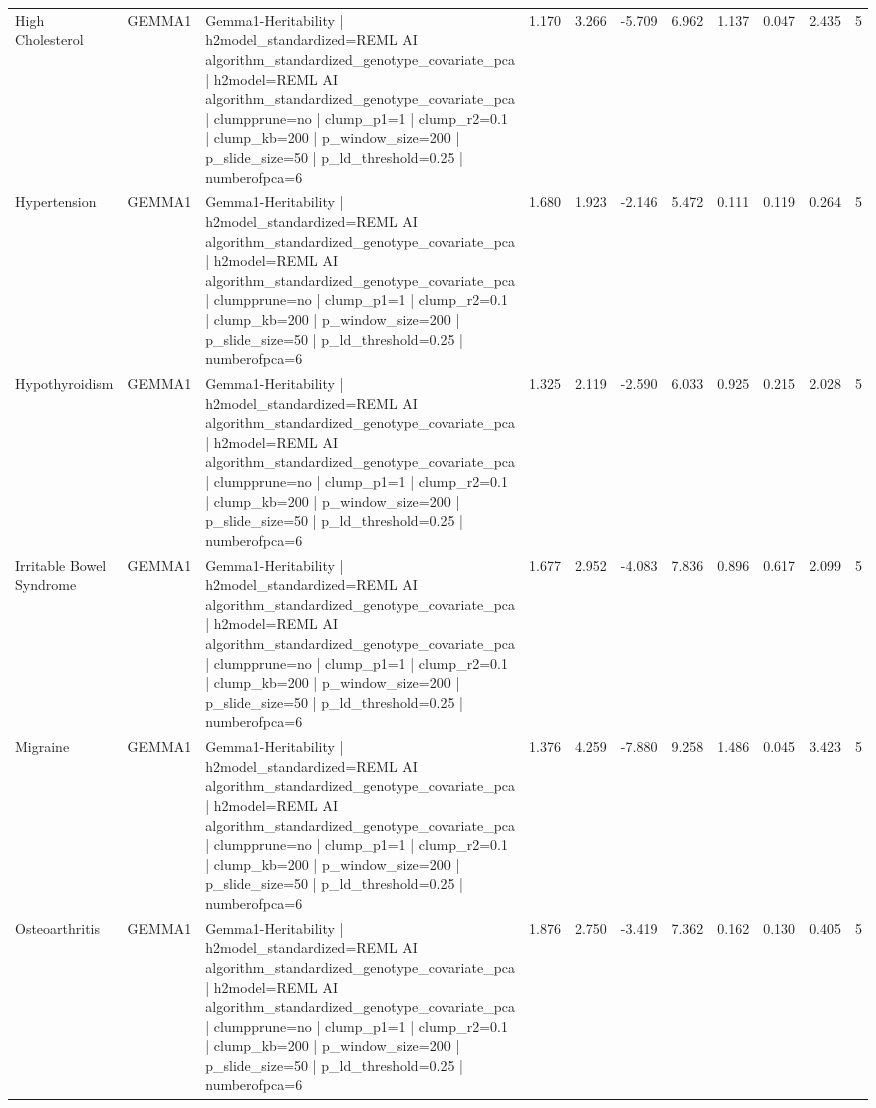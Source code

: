 \begin{landscape}
\begin{longtable}{p{2.4cm}p{1.8cm}p{6.0cm}rrrrrrrr}
High Cholesterol & GEMMA1 & Gemma1-Heritability | h2model\_standardized=REML AI algorithm\_standardized\_genotype\_covariate\_pca | h2model=REML AI algorithm\_standardized\_genotype\_covariate\_pca | clumpprune=no | clump\_p1=1 | clump\_r2=0.1 | clump\_kb=200 | p\_window\_size=200 | p\_slide\_size=50 | p\_ld\_threshold=0.25 | numberofpca=6 & 1.170 & 3.266 & -5.709 & 6.962 & 1.137 & 0.047 & 2.435 & 5 \\
Hypertension & GEMMA1 & Gemma1-Heritability | h2model\_standardized=REML AI algorithm\_standardized\_genotype\_covariate\_pca | h2model=REML AI algorithm\_standardized\_genotype\_covariate\_pca | clumpprune=no | clump\_p1=1 | clump\_r2=0.1 | clump\_kb=200 | p\_window\_size=200 | p\_slide\_size=50 | p\_ld\_threshold=0.25 | numberofpca=6 & 1.680 & 1.923 & -2.146 & 5.472 & 0.111 & 0.119 & 0.264 & 5 \\
Hypothyroidism & GEMMA1 & Gemma1-Heritability | h2model\_standardized=REML AI algorithm\_standardized\_genotype\_covariate\_pca | h2model=REML AI algorithm\_standardized\_genotype\_covariate\_pca | clumpprune=no | clump\_p1=1 | clump\_r2=0.1 | clump\_kb=200 | p\_window\_size=200 | p\_slide\_size=50 | p\_ld\_threshold=0.25 | numberofpca=6 & 1.325 & 2.119 & -2.590 & 6.033 & 0.925 & 0.215 & 2.028 & 5 \\
Irritable Bowel Syndrome & GEMMA1 & Gemma1-Heritability | h2model\_standardized=REML AI algorithm\_standardized\_genotype\_covariate\_pca | h2model=REML AI algorithm\_standardized\_genotype\_covariate\_pca | clumpprune=no | clump\_p1=1 | clump\_r2=0.1 | clump\_kb=200 | p\_window\_size=200 | p\_slide\_size=50 | p\_ld\_threshold=0.25 | numberofpca=6 & 1.677 & 2.952 & -4.083 & 7.836 & 0.896 & 0.617 & 2.099 & 5 \\
Migraine & GEMMA1 & Gemma1-Heritability | h2model\_standardized=REML AI algorithm\_standardized\_genotype\_covariate\_pca | h2model=REML AI algorithm\_standardized\_genotype\_covariate\_pca | clumpprune=no | clump\_p1=1 | clump\_r2=0.1 | clump\_kb=200 | p\_window\_size=200 | p\_slide\_size=50 | p\_ld\_threshold=0.25 | numberofpca=6 & 1.376 & 4.259 & -7.880 & 9.258 & 1.486 & 0.045 & 3.423 & 5 \\
Osteoarthritis & GEMMA1 & Gemma1-Heritability | h2model\_standardized=REML AI algorithm\_standardized\_genotype\_covariate\_pca | h2model=REML AI algorithm\_standardized\_genotype\_covariate\_pca | clumpprune=no | clump\_p1=1 | clump\_r2=0.1 | clump\_kb=200 | p\_window\_size=200 | p\_slide\_size=50 | p\_ld\_threshold=0.25 | numberofpca=6 & 1.876 & 2.750 & -3.419 & 7.362 & 0.162 & 0.130 & 0.405 & 5 \\

\end{longtable}
\end{landscape}
